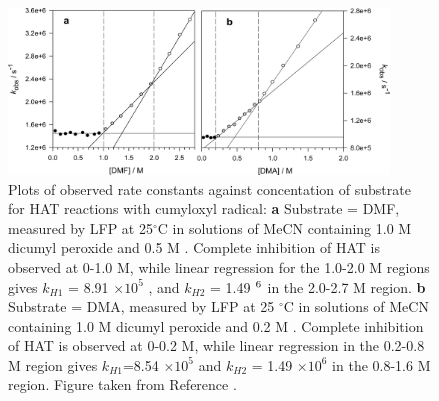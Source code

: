\begin{figure}[htb]
  \centering
  \includegraphics[width=0.9\textwidth]{figures/exptdmadmf}
  \caption[Plots of observed rate constants against concentration of substrate for HAT
  reactions with cumyloxyl radical.]{Plots of observed rate constants against
    concentation of substrate for HAT reactions with cumyloxyl radical: \textbf{a}
    Substrate = DMF, measured by LFP at 25$^{\circ}$C in solutions of MeCN
    containing 1.0 M dicumyl peroxide and 0.5 M . Complete inhibition
    of HAT is observed at 0-1.0 M, while linear regression for the 1.0-2.0
    M regions gives $k_{H1}$ = 8.91 $\times 10^5$ \Ms, and $k_{H2}$ = 1.49
    $\time 10^6$ \Ms in the 2.0-2.7 M region. \textbf{b} Substrate = DMA,
    measured by LFP at 25 $^{\circ}$C in solutions of MeCN containing 1.0 M
    dicumyl peroxide and 0.2 M . Complete inhibition of HAT is
    observed at 0-0.2 M, while linear regression in the 0.2-0.8 M
    region gives $k_{H1}$=8.54 $\times 10^5$ \Ms and $k_{H2}$ = 1.49
    $\times 10^6$ \Ms in the 0.8-1.6 M region. Figure taken from Reference
    .}
    \label{fig:expdmadmf}
\end{figure}


\newpage


